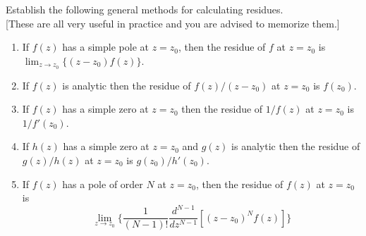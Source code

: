 \documentclass[a4paper]{article}
\begin{document}
\begin{qns}[Residues]
Establish the following general methods for calculating residues.\\[5pt]
[These are all very useful in practice and you are advised to memorize them.]
\begin{enumerate}[label=(\roman*)]
    \item If $f(z)$ has a simple pole at $z=z_0$, then the residue of $f$ at $z=z_0$ is $\lim_{z\rightarrow z_0}\{(z-z_0)f(z)\}$.
    \item If $f(z)$ is analytic then the residue of $f(z)/(z-z_0)$ at $z = z_0$ is $f(z_0)$.
    \item If $f(z)$ has a simple zero at $z = z_0$ then the residue of $1/f(z)$ at $z=z_0$ is $1/f'(z_0)$.
    \item If $h(z)$ has a simple zero at $z = z_0$ and $g(z)$ is analytic then the residue of $g(z)/h(z)$ at $z = z_0$ is $g(z_0)/h'(z_0)$.
    \item If $f(z)$ has a pole of order $N$ at $z=z_0$, then the residue of $f(z)$ at $z=z_0$ is
    $$\lim_{z\rightarrow z_0}\bigg\{\frac{1}{(N-1)!}\frac{d^{N-1}}{dz^{N-1}}[(z-z_0)^Nf(z)]\bigg\}$$
    \end{enumerate}
\end{qns}
\end{document}
